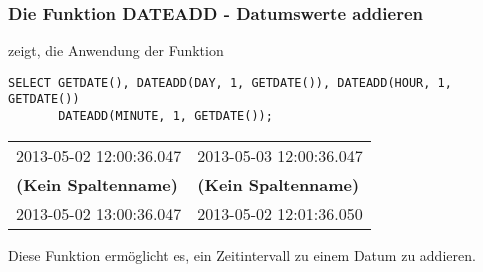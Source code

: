         \subsubsection{Die Funktion DATEADD - Datumswerte addieren}
           zeigt, die Anwendung der Funktion 
          \begin{lstlisting}[language=ms_sql,caption={Die Funktion \languagemssql{DATEADD} in SQL Server},label=sql03_22]
SELECT GETDATE(), DATEADD(DAY, 1, GETDATE()), DATEADD(HOUR, 1, GETDATE())
       DATEADD(MINUTE, 1, GETDATE());
          \end{lstlisting}
          \begin{center}
            \begin{small}
              \tabletail{}
              \tablelasttail{}
              \begin{mssql}
                \begin{supertabular}{ll}
                  2013-05-02 12:00:36.047 & 2013-05-03 12:00:36.047 \\
                  \textbf{(Kein Spaltenname)} & \textbf{(Kein Spaltenname)} \\
                  \cmidrule(l){1-1}\cmidrule(l){2-2}
                  2013-05-02 13:00:36.047 & 2013-05-02 12:01:36.050 \\
                \end{supertabular}
              \end{mssql}
            \end{small}
          \end{center}
          Diese Funktion erm\"oglicht es, ein Zeitintervall zu einem Datum zu addieren.
